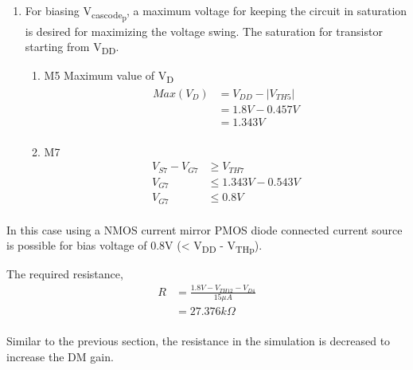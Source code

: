 \documentclass{article}
\begin{document}
\begin{enumerate}
\item For biasing V\textsubscript{cascode\textsubscript{p}}, a maximum voltage for keeping the circuit in saturation is desired
for maximizing the voltage swing. The saturation for transistor starting from V\textsubscript{DD}.
\begin{enumerate}
\item M5
Maximum value of V\textsubscript{D}
\begin{equation*}
\begin{aligned}
Max(V_{D}) &= V_{DD} - |V_{TH5}| \\
&= 1.8V - 0.457V \\
&= 1.343V \\
\end{aligned}
\end{equation*}
\item M7
\begin{equation*}
\begin{aligned}
V_{S7} - V_{G7} &\geq V_{TH7} \\
V_{G7} &\leq 1.343V - 0.543V \\
V_{G7} &\leq 0.8V \\
\end{aligned}
\end{equation*}
\end{enumerate}
\end{enumerate}


In this case using a NMOS current mirror PMOS diode connected current source is possible for bias voltage of
0.8V (< V\textsubscript{DD} - V\textsubscript{THp}).

The required resistance,
\begin{equation*}
\begin{aligned}
R &= \frac{1.8V - V_{TH12} - V_{D4}}{15\mu{}A} \\
&= 27.376k \Omega \\
\end{aligned}
\end{equation*}

Similar to the previous section, the resistance in the simulation is decreased to increase the DM gain.
\end{document}
